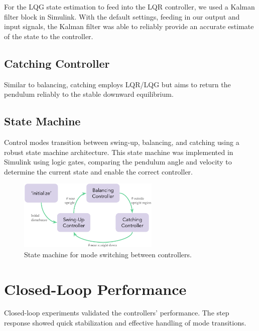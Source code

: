\documentclass[12pt]{article}
\begin{document}
For the LQG state estimation to feed into the LQR controller, we used a Kalman filter block in Simulink. 
With the default settings, feeding in our output and input signals, the Kalman filter was able to reliably provide an
accurate estimate of the state to the controller.


\subsection{Catching Controller}
Similar to balancing, catching employs LQR/LQG but aims to return the pendulum reliably to the stable downward equilibrium.

\subsection{State Machine}
Control modes transition between swing-up, balancing, and catching using a robust state machine architecture.
This state machine was implemented in Simulink using logic gates, comparing the pendulum angle and velocity to determine the current state and enable the correct controller.

\begin{figure}[H]
    \centering
    \includegraphics[width=0.6\textwidth]{figures/state_machine.png}
    \caption{State machine for mode switching between controllers.}
    \label{fig:state_machine}
\end{figure}

\section{Closed-Loop Performance}

Closed-loop experiments validated the controllers' performance. The step response showed quick stabilization and effective handling of mode transitions.
\end{document}
